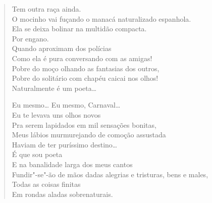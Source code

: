 \begin{verse}
Tem outra raça ainda.\\
O mocinho vai fuçando o manacá naturalizado espanhola.\\
Ela se deixa bolinar na multidão compacta.\\
\qquad\qquad\qquad\qquad\qquad\qquad\quad Por engano.\\
Quando aproximam dos polícias\\
Como ela é pura conversando com as amigas!\\
Pobre do moço olhando as fantasias dos outros,\\
Pobre do solitário com chapéu caicai nos olhos!\\
Naturalmente é um poeta\ldots{}

Eu mesmo\ldots{} Eu mesmo, Carnaval\ldots{}\\
Eu te levava uns olhos novos\\
Pra serem lapidados em mil sensações bonitas,\\
Meus lábios murmurejando de comoção assustada\\
Haviam de ter puríssimo destino\ldots{}\\
É que sou poeta\\
E na banalidade larga dos meus cantos\\
Fundir"-se"-ão de mãos dadas alegrias e tristuras, bens e males,\\
Todas as coisas finitas\\
Em rondas aladas sobrenaturais.


\end{verse}
